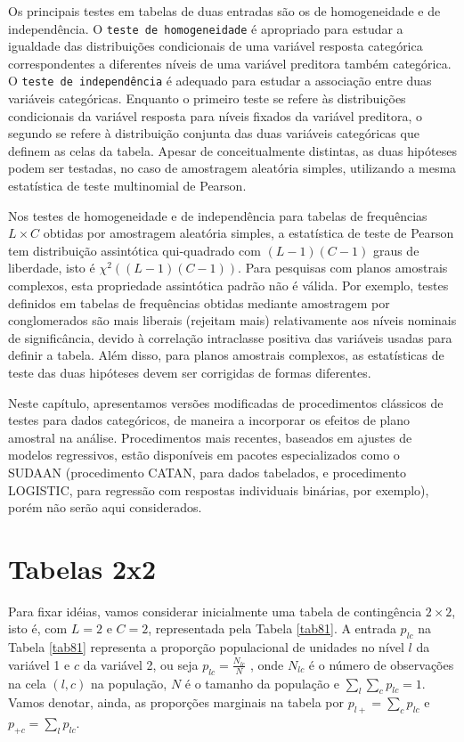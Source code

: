 \documentclass[]{book}
\numberwithin{example}{chapter}
\numberwithin{remark}{chapter}
\numberwithin{definition}{chapter}
\begin{document}
Os principais testes em tabelas de duas entradas são os de homogeneidade
e de independência. O \texttt{teste\ de\ homogeneidade} é apropriado
para estudar a igualdade das distribuições condicionais de uma variável
resposta categórica correspondentes a diferentes níveis de uma variável
preditora também categórica. O \texttt{teste\ de\ independência} é
adequado para estudar a associação entre duas variáveis categóricas.
Enquanto o primeiro teste se refere às distribuições condicionais da
variável resposta para níveis fixados da variável preditora, o segundo
se refere à distribuição conjunta das duas variáveis categóricas que
definem as celas da tabela. Apesar de conceitualmente distintas, as duas
hipóteses podem ser testadas, no caso de amostragem aleatória simples,
utilizando a mesma estatística de teste multinomial de Pearson.

Nos testes de homogeneidade e de independência para tabelas de
frequências \(L\times C\) obtidas por amostragem aleatória simples, a
estatística de teste de Pearson tem distribuição assintótica
qui-quadrado com \((L-1)(C-1)\) graus de liberdade, isto é
\(\chi ^{2}\left( (L-1)(C-1)\right)\). Para pesquisas com planos
amostrais complexos, esta propriedade assintótica padrão não é válida.
Por exemplo, testes definidos em tabelas de frequências obtidas mediante
amostragem por conglomerados são mais liberais (rejeitam mais)
relativamente aos níveis nominais de significância, devido à correlação
intraclasse positiva das variáveis usadas para definir a tabela. Além
disso, para planos amostrais complexos, as estatísticas de teste das
duas hipóteses devem ser corrigidas de formas diferentes.

Neste capítulo, apresentamos versões modificadas de procedimentos
clássicos de testes para dados categóricos, de maneira a incorporar os
efeitos de plano amostral na análise. Procedimentos mais recentes,
baseados em ajustes de modelos regressivos, estão disponíveis em pacotes
especializados como o SUDAAN (procedimento CATAN, para dados tabelados,
e procedimento LOGISTIC, para regressão com respostas individuais
binárias, por exemplo), porém não serão aqui considerados.

\section{Tabelas 2x2}\label{tabelas22}

Para fixar idéias, vamos considerar inicialmente uma tabela de
contingência \(2\times 2\), isto é, com \(L=2\) e \(C=2\), representada
pela Tabela \ref{tab81}. A entrada \(p_{lc}\) na Tabela \ref{tab81}
representa a proporção populacional de unidades no nível \(l\) da
variável 1 e \(c\) da variável 2, ou seja \(p_{lc}=\frac{N_{lc}}{N}\) ,
onde \(N_{lc}\) é o número de observações na cela \(\left( l,c\right)\)
na população, \(N\) é o tamanho da população e
\(\sum\nolimits_{l}\sum\nolimits_{c}p_{lc}=1\). Vamos denotar, ainda, as
proporções marginais na tabela por \(p_{l+}=\sum\nolimits_{c}p_{lc}\) e
\(p_{+c}=\sum_{l}p_{lc}\).
\end{document}
